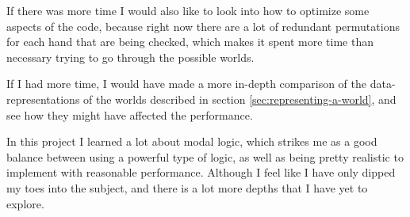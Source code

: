 If there was more time I would also like to look into how to optimize some aspects of the code, because right now there are a lot of redundant permutations for each hand that are being checked, which makes it spent more time than necessary trying to go through the possible worlds.

If I had more time, I would have made a more in-depth comparison of the data-representations of the worlds described in section \ref{sec:representing-a-world}, and see how they might have affected the performance.








In this project I learned a lot about modal logic, which strikes me as a good balance between using a powerful type of logic, as well as being pretty realistic to implement with reasonable performance. Although I feel like I have only dipped my toes into the subject, and there is a lot more depths that I have yet to explore.


